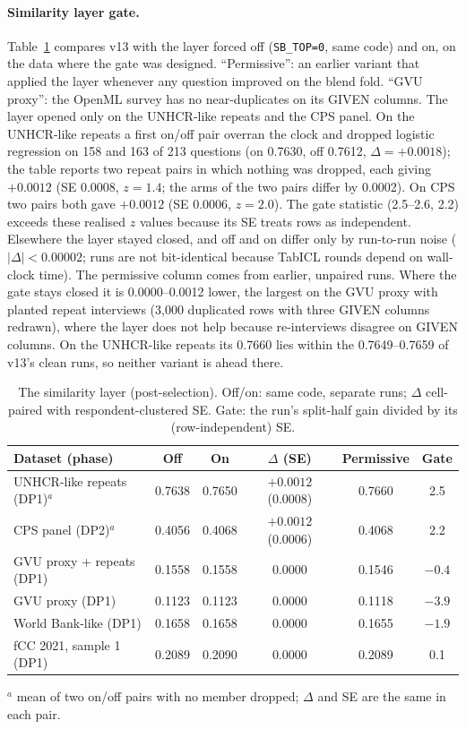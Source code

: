 \documentclass{article}
\begin{document}
\paragraph{Similarity layer gate.} Table~\ref{tab:gate} compares v13 with the layer forced off (\texttt{SB\_TOP=0}, same code) and on, on the data where the gate was designed. ``Permissive'': an earlier variant that applied the layer whenever any question improved on the blend fold. ``GVU proxy'': the OpenML survey has no near-duplicates on its GIVEN columns. The layer opened only on the UNHCR-like repeats and the CPS panel. On the UNHCR-like repeats a first on/off pair overran the clock and dropped logistic regression on 158 and 163 of 213 questions (on 0.7630, off 0.7612, $\Delta=+0.0018$); the table reports two repeat pairs in which nothing was dropped, each giving $+0.0012$ (SE 0.0008, $z=1.4$; the arms of the two pairs differ by 0.0002). On CPS two pairs both gave $+0.0012$ (SE 0.0006, $z=2.0$). The gate statistic (2.5--2.6, 2.2) exceeds these realised $z$ values because its SE treats rows as independent. Elsewhere the layer stayed closed, and off and on differ only by run-to-run noise ($|\Delta|<0.00002$; runs are not bit-identical because TabICL rounds depend on wall-clock time). The permissive column comes from earlier, unpaired runs. Where the gate stays closed it is 0.0000--0.0012 lower, the largest on the GVU proxy with planted repeat interviews (3{,}000 duplicated rows with three GIVEN columns redrawn), where the layer does not help because re-interviews disagree on GIVEN columns. On the UNHCR-like repeats its 0.7660 lies within the 0.7649--0.7659 of v13's clean runs, so neither variant is ahead there.

\begin{table}[h]
\centering
\small
\caption{The similarity layer (post-selection). Off/on: same code, separate runs; $\Delta$ cell-paired with respondent-clustered SE. Gate: the run's split-half gain divided by its (row-independent) SE.}
\label{tab:gate}
\begin{tabular}{lccccc}
  \toprule
  Dataset (phase) & Off & On & $\Delta$ (SE) & Permissive & Gate \\
  \midrule
  UNHCR-like repeats (DP1)$^a$ & 0.7638 & 0.7650 & $+0.0012$ (0.0008) & 0.7660 & 2.5 \\
  CPS panel (DP2)$^a$ & 0.4056 & 0.4068 & $+0.0012$ (0.0006) & 0.4068 & 2.2 \\
  GVU proxy + repeats (DP1) & 0.1558 & 0.1558 & $0.0000$ & 0.1546 & $-0.4$ \\
  GVU proxy (DP1) & 0.1123 & 0.1123 & $0.0000$ & 0.1118 & $-3.9$ \\
  World Bank-like (DP1) & 0.1658 & 0.1658 & $0.0000$ & 0.1655 & $-1.9$ \\
  fCC 2021, sample 1 (DP1) & 0.2089 & 0.2090 & $0.0000$ & 0.2089 & 0.1 \\
  \bottomrule
\end{tabular}

\smallskip\footnotesize $^a$ mean of two on/off pairs with no member dropped; $\Delta$ and SE are the same in each pair.
\end{table}
\end{document}
